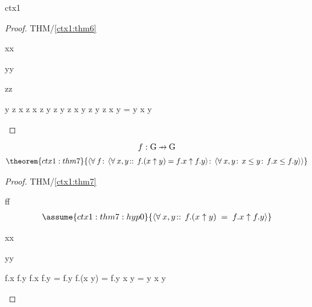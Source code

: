 \documentclass[12pt]{amsart}
\begin{document}
\begin{context}{ctx1}
\begin{proof}{THM/\ref{ctx1:thm6}}
	\begin{free:var}{x}{x}
	\begin{free:var}{y}{y}
	\begin{free:var}{z}{z}
\begin{calculation}
		y \le z \1\implies x \le z
		x \le z \1\land y \le z \2\equiv y \le z
		x \uparrow y \le z \2\equiv y \le z
		x \uparrow y = y
	\hint{=}{ \eqref{ctx1:thm5} }
		x  \le y
\end{calculation}
	\end{free:var}
	\end{free:var}
	\end{free:var}
\end{proof}

\[ \dummy{ f : \G \pfun \G } \]
%
\begin{align}
\theorem{ctx1:thm7}{ \qforall{f}{\qforall{x,y}{}{ f.(x \uparrow y) = f.x \uparrow f.y } }{ \qforall{x,y}{ x \le y }{ f.x \le f.y } } }
\end{align}

\begin{proof}{THM/\ref{ctx1:thm7}}
	\begin{free:var}{f}{f}
	\begin{align}
	\assume{ctx1:thm7:hyp0}{ \qforall{x,y}{}{ 
		f.(x \uparrow y) \1= f.x \uparrow f.y } } 
	\hide{ \goal{ \qforall{x,y}{ x \le y }{ f.x \le f.y } } }
	\end{align}
	\begin{free:var}{x}{x}
	\begin{free:var}{y}{y}
\begin{calculation}
		f.x \le f.y
	\hint{=}{ \eqref{ctx1:thm5} }
		f.x \uparrow f.y \1= f.y
	\hint{=}{ \eqref{ctx1:thm7:hyp0} }
		f.(x \uparrow y) \1 = f.y
		x \uparrow y \1= y
	\hint{=}{ \eqref{ctx1:thm5} }
		x  \le y
\end{calculation}
	\end{free:var}
	\end{free:var}
	\end{free:var}
\end{proof}


\end{context}
\end{document}
